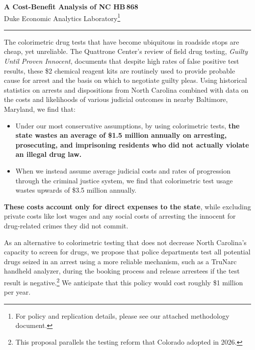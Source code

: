 \documentclass[11pt]{article}
\providecommand{\resPolicyCostRounded}{1 million}
\begin{document}
\begin{center}
    {\LARGE\bfseries A Cost-Benefit Analysis of NC HB\,868}\\[4pt]
    {Duke Economic Analytics Laboratory\footnote{For policy and replication details, please see our attached methodology document.}}
\end{center}

\vspace{4pt}
\hrule
\vspace{10pt}

The colorimetric drug tests that have become ubiquitous in roadside stops are cheap, yet unreliable. The Quattrone Center's review of field drug testing, \emph{Guilty Until Proven Innocent}, documents that despite high rates of false positive test results, these \$2 chemical reagent kits are routinely used to provide probable cause for arrest and the basis on which to negotiate guilty pleas. Using historical statistics on arrests and dispositions from North Carolina combined with data on the costs and likelihoods of various judicial outcomes in nearby Baltimore, Maryland, we find that:
\begin{itemize}
    \item Under our most conservative assumptions, by using colorimetric tests, \textbf{the state wastes an average of \$1.5 million annually on arresting, prosecuting, and imprisoning residents who did not actually violate an illegal drug law.}
    \item When we instead assume average judicial costs and rates of progression through the criminal justice system, we find that colorimetric test usage wastes upwards of \$3.5 million annually.
\end{itemize}

\textbf{These costs account only for direct expenses to the state}, while excluding private costs like lost wages and any social costs of arresting the innocent for drug-related crimes they did not commit.

As an alternative to colorimetric testing that does not decrease North Carolina's capacity to screen for drugs, we propose that police departments test all potential drugs seized in an arrest using a more reliable mechanism, such as a TruNarc handheld analyzer, during the booking process and release arrestees if the test result is negative.\footnote{This proposal parallels the testing reform that Colorado adopted in 2026.} We anticipate that this policy would cost roughly \$\resPolicyCostRounded{} per year.
\end{document}
